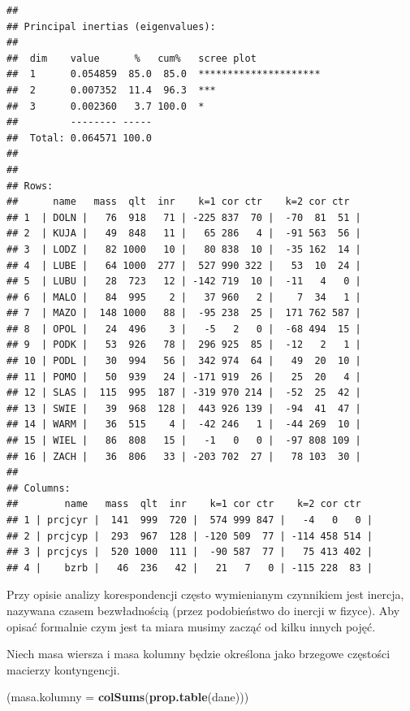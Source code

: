 \documentclass[polish,]{book}
\newenvironment{Shaded}{\begin{snugshade}}{\end{snugshade}}
\newcommand{\DataTypeTok}[1]{\textcolor[rgb]{0.13,0.29,0.53}{#1}}
\newcommand{\KeywordTok}[1]{\textcolor[rgb]{0.13,0.29,0.53}{\textbf{#1}}}
\newcommand{\NormalTok}[1]{#1}
\begin{document}
\begin{verbatim}
## 
## Principal inertias (eigenvalues):
## 
##  dim    value      %   cum%   scree plot               
##  1      0.054859  85.0  85.0  *********************    
##  2      0.007352  11.4  96.3  ***                      
##  3      0.002360   3.7 100.0  *                        
##         -------- -----                                 
##  Total: 0.064571 100.0                                 
## 
## 
## Rows:
##      name   mass  qlt  inr    k=1 cor ctr    k=2 cor ctr  
## 1  | DOLN |   76  918   71 | -225 837  70 |  -70  81  51 |
## 2  | KUJA |   49  848   11 |   65 286   4 |  -91 563  56 |
## 3  | LODZ |   82 1000   10 |   80 838  10 |  -35 162  14 |
## 4  | LUBE |   64 1000  277 |  527 990 322 |   53  10  24 |
## 5  | LUBU |   28  723   12 | -142 719  10 |  -11   4   0 |
## 6  | MALO |   84  995    2 |   37 960   2 |    7  34   1 |
## 7  | MAZO |  148 1000   88 |  -95 238  25 |  171 762 587 |
## 8  | OPOL |   24  496    3 |   -5   2   0 |  -68 494  15 |
## 9  | PODK |   53  926   78 |  296 925  85 |  -12   2   1 |
## 10 | PODL |   30  994   56 |  342 974  64 |   49  20  10 |
## 11 | POMO |   50  939   24 | -171 919  26 |   25  20   4 |
## 12 | SLAS |  115  995  187 | -319 970 214 |  -52  25  42 |
## 13 | SWIE |   39  968  128 |  443 926 139 |  -94  41  47 |
## 14 | WARM |   36  515    4 |  -42 246   1 |  -44 269  10 |
## 15 | WIEL |   86  808   15 |   -1   0   0 |  -97 808 109 |
## 16 | ZACH |   36  806   33 | -203 702  27 |   78 103  30 |
## 
## Columns:
##        name   mass  qlt  inr    k=1 cor ctr    k=2 cor ctr  
## 1 | prcjcyr |  141  999  720 |  574 999 847 |   -4   0   0 |
## 2 | prcjcyp |  293  967  128 | -120 509  77 | -114 458 514 |
## 3 | prcjcys |  520 1000  111 |  -90 587  77 |   75 413 402 |
## 4 |    bzrb |   46  236   42 |   21   7   0 | -115 228  83 |
\end{verbatim}

Przy opisie analizy korespondencji często wymienianym czynnikiem jest inercja, nazywana czasem bezwładnością (przez podobieństwo do inercji w fizyce). Aby
opisać formalnie czym jest ta miara musimy zacząć od kilku innych pojęć.

Niech masa wiersza i masa kolumny będzie określona jako brzegowe częstości
macierzy kontyngencji.

\begin{Shaded}
\begin{Highlighting}[]
\NormalTok{(}\DataTypeTok{masa.kolumny =} \KeywordTok{colSums}\NormalTok{(}\KeywordTok{prop.table}\NormalTok{(dane)))}
\end{Highlighting}
\end{Shaded}
\end{document}
